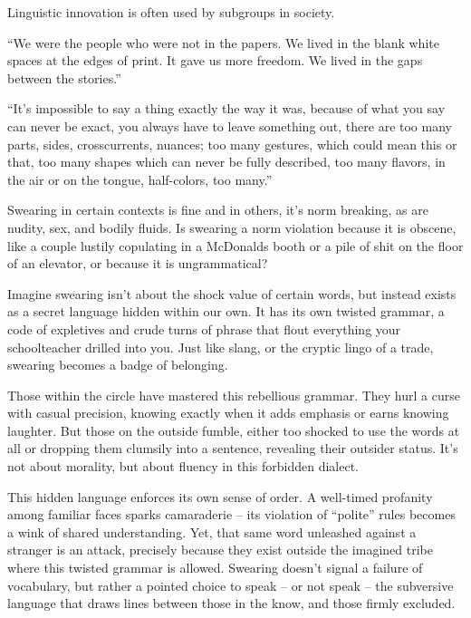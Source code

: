 

Linguistic innovation is often used by subgroups in society. 

“We were the people who were not in the papers. We lived in the blank white spaces at the edges of print. It gave us more freedom.
We lived in the gaps between the stories.”

“It's impossible to say a thing exactly the way it was, because of what you say can never be exact, you always have to leave something out, there are too many parts, sides, crosscurrents, nuances; too many gestures, which could mean this or that, too many shapes which can never be fully described, too many flavors, in the air or on the tongue, half-colors, too many.”

Swearing in certain contexts is fine and in others, it's norm breaking, as are nudity, sex, and bodily fluids. Is swearing a norm violation because it is obscene, like a couple lustily copulating in a McDonalds booth or a pile of shit on the floor of an elevator, or because it is ungrammatical?

Imagine swearing isn't about the shock value of certain words, but instead exists as a secret language hidden within our own. It has its own twisted grammar, a code of expletives and crude turns of phrase that flout everything your schoolteacher drilled into you. Just like slang, or the cryptic lingo of a trade, swearing becomes a badge of belonging.

Those within the circle have mastered this rebellious grammar. They hurl a curse with casual precision, knowing exactly when it adds emphasis or earns knowing laughter.  But those on the outside fumble, either too shocked to use the words at all or dropping them clumsily into a sentence, revealing their outsider status. It's not about morality, but about fluency in this forbidden dialect.

This hidden language enforces its own sense of order. A well-timed profanity among familiar faces sparks camaraderie – its violation of “polite” rules becomes a wink of shared understanding. Yet, that same word unleashed against a stranger is an attack, precisely because they exist outside the imagined tribe where this twisted grammar is allowed. Swearing doesn't signal a failure of vocabulary, but rather a pointed choice to speak – or not speak – the subversive language that draws lines between those in the know, and those firmly excluded.